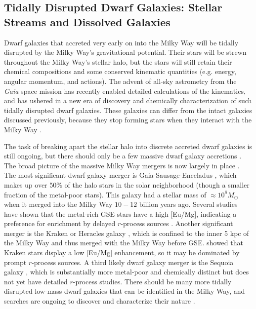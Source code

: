 \documentclass[letterpaper]{article}
\begin{document}
\subsection{Tidally Disrupted Dwarf Galaxies: Stellar Streams and Dissolved Galaxies}\label{sec:disrupteddwarfs}

Dwarf galaxies that accreted very early on into the Milky Way will be tidally disrupted by the Milky Way's gravitational potential. Their stars will be strewn throughout the Milky Way's stellar halo, but the stars will still retain their chemical compositions and some conserved kinematic quantities (e.g. energy, angular momentum, and actions).
The advent of all-sky astrometry from the \emph{Gaia} space mission \citep{GaiaCollaboration2016} has recently enabled detailed calculations of the kinematics, and has ushered in a new era of discovery and chemically characterization of such tidally disrupted dwarf galaxies. These galaxies can differ from the intact galaxies discussed previously, because they stop forming stars when they interact with the Milky Way \citep[e.g.,][]{Johnston2008,Fillingham2019}.

The task of breaking apart the stellar halo into discrete accreted dwarf galaxies is still ongoing, but there should only be a few massive dwarf galaxy accretions \citep[e.g.,][]{Deason2016,Brauer2019}. The broad picture of the massive Milky Way mergers is now largely in place \citep[e.g.,][]{Naidu2020,Kruijssen2020}.
The most significant dwarf galaxy merger is Gaia-Sausage-Enceladus \citep[or GSE,][]{Belokurov2018, Helmi2018}, which makes up over 50\% of the halo stars in the solar neighborhood (though a smaller fraction of the metal-poor stars).
This galaxy had a stellar mass of ${\approx}10^8 M_\odot$ when it merged into the Milky Way $10-12$ billion years ago. Several studies have shown that the metal-rich GSE stars have a high [Eu/Mg], indicating a preference for enrichment by delayed $r$-process sources \citep{Matsuno2021,Aguado2021,Naidu2022}.
Another significant merger is the Kraken or Heracles galaxy \citep{Kruijssen2020,Horta2021}, which is confined to the inner 5 kpc of the Milky Way and thus merged with the Milky Way before GSE. \citet{Naidu2022} showed that Kraken stars display a low [Eu/Mg] enhancement, so it may be dominated by prompt $r$-process sources.
A third likely dwarf galaxy merger is the Sequoia galaxy \citep{Matsuno2019,Myeong2019}, which is substantially more metal-poor and chemically distinct \citep{Matsuno2022} but does not yet have detailed $r$-process studies.
There should be many more tidally disrupted low-mass dwarf galaxies that can be identified in the Milky Way, and searches are ongoing to discover and characterize their nature \citep[e.g.,][]{Roederer2018,Naidu2020,Yuan2020,Gudin2021,Shank2022,Brauer2022, Mardini2022}.
\end{document}
